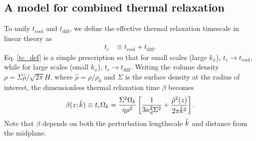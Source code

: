 \subsection{A model for combined thermal relaxation}\label{toy_relax}
To unify $t_\mathrm{cool}$ and $t_\mathrm{diff}$, we define the
effective thermal relaxation timescale in linear theory as
\begin{align}\label{tc_def}
  t_c &\equiv t_\mathrm{cool} + t _\mathrm{diff}. %
\end{align}
Eq. \ref{tc_def} is a simple prescription so
that for small scales (large $k_x$), $t_c\to t_\mathrm{cool}$, while
for large scales (small $k_x$), $t_c\to t_\mathrm{diff}$. Writing the
volume density $\rho = \Sigma\hat{\rho}/\sqrt{2\pi}H$, where
$\hat{\rho} = \rho/\rho_0$ and $\Sigma$ is the surface density at the
radius of interest, the dimensionless thermal
relaxation time $\beta$ becomes 
\begin{align}\label{real_beta}
  \beta(z;\hat{k}) \equiv t_c\Omega_k =
  \frac{\Sigma^2\Omega_k}{\eta\rho^2}\left[\frac{1}{3\kappa_d^2\Sigma^2} 
    + \frac{\hat{\rho}^2(z)}{2\pi \hat{k}^2}\right].
\end{align}
Note that $\beta$ depends on both the perturbation lengthscale $\hat{k}$ 
and distance from the midplane. 

